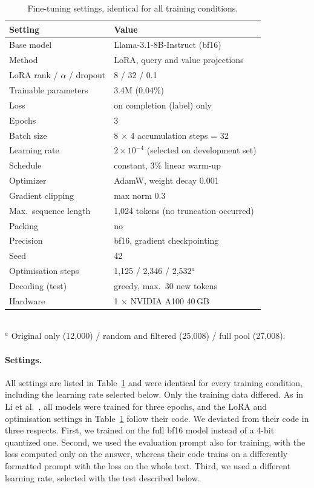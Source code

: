 \documentclass[sigconf]{acmart}
\begin{document}
\begin{table}[H]
  \centering
  \caption{Fine-tuning settings, identical for all training conditions.}
  \label{tab:training}
  \small
  \begin{tabular}{ll}
    \toprule
    Setting & Value \\
    \midrule
    Base model            & Llama-3.1-8B-Instruct (bf16) \\
    Method                & LoRA, query and value projections \\
    LoRA rank / $\alpha$ / dropout & 8 / 32 / 0.1 \\
    Trainable parameters  & 3.4M (0.04\%) \\
    Loss                  & on completion (label) only \\
    Epochs                & 3 \\
    Batch size            & 8 $\times$ 4 accumulation steps = 32 \\
    Learning rate         & $2\times10^{-4}$ (selected on development set) \\
    Schedule              & constant, 3\% linear warm-up \\
    Optimizer             & AdamW, weight decay 0.001 \\
    Gradient clipping     & max norm 0.3 \\
    Max.\ sequence length & 1,024 tokens (no truncation occurred) \\
    Packing               & no \\
    Precision             & bf16, gradient checkpointing \\
    Seed                  & 42 \\
    Optimisation steps    & 1,125 / 2,346 / 2,532$^{a}$ \\
    Decoding (test)       & greedy, max.\ 30 new tokens \\
    Hardware              & 1 $\times$ NVIDIA A100 40\,GB \\
    \bottomrule
  \end{tabular}\\[2pt]
  {\footnotesize $^{a}$ Original only (12,000) / random and filtered (25,008) / full pool (27,008).}
\end{table}

\paragraph{Settings.}
All settings are listed in Table~\ref{tab:training} and were identical for every training condition, including the learning rate selected below. Only the training data differed.
As in Li et al.~\cite{li2026inheritance}, all models were trained for three epochs, and the LoRA and optimisation settings in Table~\ref{tab:training} follow their code. We deviated from their code in three respects. First, we trained on the full bf16 model instead of a 4-bit quantized one. Second, we used the evaluation prompt also for training, with the loss computed only on the answer, whereas their code trains on a differently formatted prompt with the loss on the whole text. Third, we used a different learning rate, selected with the test described below.
\end{document}
